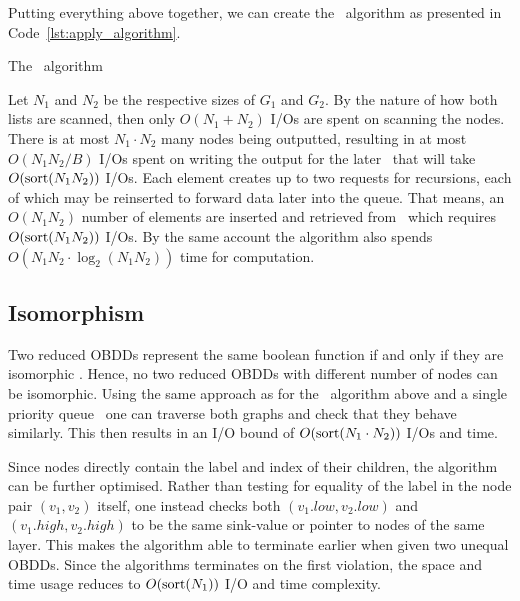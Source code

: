 Putting everything above together, we can create the \Apply\ algorithm as
presented in Code~\ref{lst:apply_algorithm}.

\begin{lstfloat}[ht!]
  \centering

  

  \caption{The \Apply\ algorithm}
  \label{lst:apply_algorithm}
\end{lstfloat}

\clearpage
Let $N_1$ and $N_2$ be the respective sizes of $G_1$ and $G_2$. By the nature of
how both lists are scanned, then only $O(N_1 + N_2)$ I/Os are spent on scanning
the nodes. There is at most $N_1 \cdot N_2$ many nodes being outputted,
resulting in at most $O(N_1 N_2 / B)$ I/Os spent on writing the output for the
later \Reduce\ that will take $O(\text{sort}(N_1 N_2))$ I/Os. Each element creates up
to two requests for recursions, each of which may be reinserted to forward data
later into the queue. That means, an $O(N_1 N_2)$ number of elements are
inserted and retrieved from \ApplyQrec\ which requires $O(\text{sort}(N_1 N_2))$ I/Os.
By the same account the algorithm also spends $O(N_1 N_2 \cdot \log_2 (N_1 N_2))$
time for computation. \cite{Arge96}

\subsection{Isomorphism} \label{sec:theory__equal}
Two reduced OBDDs represent the same boolean function if and only if they are
isomorphic \cite[Theorem 1]{Bryant86}. Hence, no two reduced OBDDs with
different number of nodes can be isomorphic. Using the same approach as for the
\Apply\ algorithm above and a single priority queue \IsomorphicQrec\, one can
traverse both graphs and check that they behave similarly. This then results in
an I/O bound of $O(\text{sort}(N_1 \cdot N_2))$ I/Os and time.

Since nodes directly contain the label and index of their children, the
algorithm can be further optimised. Rather than testing for equality of the
label in the node pair $(v_1,v_2)$ itself, one instead checks both
$(v_1.\mathit{low}, v_2.\mathit{low})$ and $(v_1.\mathit{high},
v_2.\mathit{high})$ to be the same sink-value or pointer to nodes of the same
layer. This makes the algorithm able to terminate earlier when given two unequal
OBDDs. Since the algorithms terminates on the first violation, the space and
time usage reduces to $O(\text{sort}(N_1))$ I/O and time complexity.

